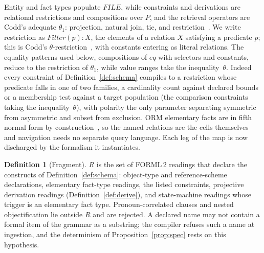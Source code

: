 \documentclass[10pt,twocolumn]{article}
\theoremstyle{plain}
\theoremstyle{definition}
\newtheorem{definition}{Definition}
\begin{document}
\noindent Entity and fact types populate $\mathit{FILE}$, while constraints and derivations are relational restrictions and compositions over $P$, and the retrieval operators are Codd's adequate $\theta_1$: projection, natural join, tie, and restriction~\cite[Sec.\,2.2]{codd70}. We write restriction as $\mathit{Filter}(p)\!:\!X$, the elements of a relation $X$ satisfying a predicate $p$; this is Codd's $\theta$-restriction~\cite[Sec.\,2.3.5]{codd72}, with constants entering as literal relations. The equality patterns used below, compositions of $\mathit{eq}$ with selectors and constants, reduce to the restriction of $\theta_1$, while value ranges take the inequality~$\theta$. Indeed every constraint of Definition~\ref{def:schema} compiles to a restriction whose predicate falls in one of two families, a cardinality count against declared bounds or a membership test against a target population (the comparison constraints taking the inequality~$\theta$), with polarity the only parameter separating symmetric from asymmetric and subset from exclusion. ORM elementary facts are in fifth normal form by construction~\cite{halpin08}, so the named relations are the cells themselves and navigation needs no separate query language. Each leg of the map is now discharged by the formalism it instantiates.

\begin{definition}[Fragment]\label{def:fragment}
$R$ is the set of FORML\,2 readings that declare the constructs of Definition~\ref{def:schema}: object-type and reference-scheme declarations, elementary fact-type readings, the listed constraints, projective derivation readings (Definition~\ref{def:derive}), and state-machine readings whose trigger is an elementary fact type. Pronoun-correlated clauses and nested objectification lie outside $R$ and are rejected. A declared name may not contain a formal item of the grammar as a substring; the compiler refuses such a name at ingestion, and the determinism of Proposition~\ref{prop:spec} rests on this hypothesis.
\end{definition}
\end{document}
